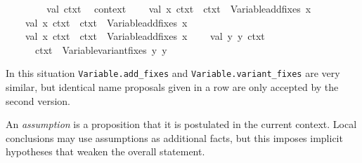 \begin{isabellebody}
\isanewline
%
\isadelimML
\ \ %
\endisadelimML
%
\isatagML
{}\isamarkupfalse%
\ {\isacharverbatimopen}\isanewline
\ \ \ \ val\ ctxt{}\ {\isacharequal}\ %
\isaantiq
context%
\endisaantiq
{\isacharsemicolon}\isanewline
\isanewline
\ \ \ \ val\ {\isacharparenleft}{\isacharbrackleft}x{}{\isacharbrackright}{\isacharcomma}\ ctxt{}{\isacharparenright}\ {\isacharequal}\ ctxt{}\ {\isacharbar}{\isachargreater}\ Variable{\isachardot}add{\isacharunderscore}fixes\ {\isacharbrackleft}{\isachardoublequote}x{\isachardoublequote}{\isacharbrackright}{\isacharsemicolon}\isanewline
\ \ \ \ val\ {\isacharparenleft}{\isacharbrackleft}x{}{\isacharbrackright}{\isacharcomma}\ ctxt{}{\isacharparenright}\ {\isacharequal}\ ctxt{}\ {\isacharbar}{\isachargreater}\ Variable{\isachardot}add{\isacharunderscore}fixes\ {\isacharbrackleft}{\isachardoublequote}x{\isachardoublequote}{\isacharbrackright}{\isacharsemicolon}\isanewline
\ \ \ \ val\ {\isacharparenleft}{\isacharbrackleft}x{}{\isacharbrackright}{\isacharcomma}\ ctxt{}{\isacharparenright}\ {\isacharequal}\ ctxt{}\ {\isacharbar}{\isachargreater}\ Variable{\isachardot}add{\isacharunderscore}fixes\ {\isacharbrackleft}{\isachardoublequote}x{\isachardoublequote}{\isacharbrackright}{\isacharsemicolon}\isanewline
\isanewline
\ \ \ \ val\ {\isacharparenleft}{\isacharbrackleft}y{}{\isacharcomma}\ y{}{\isacharbrackright}{\isacharcomma}\ ctxt{}{\isacharparenright}\ {\isacharequal}\isanewline
\ \ \ \ \ \ ctxt{}\ {\isacharbar}{\isachargreater}\ Variable{\isachardot}variant{\isacharunderscore}fixes\ {\isacharbrackleft}{\isachardoublequote}y{\isachardoublequote}{\isacharcomma}\ {\isachardoublequote}y{\isachardoublequote}{\isacharbrackright}{\isacharsemicolon}\isanewline
\ \ {\isacharverbatimclose}\isanewline
\ \ \isamarkupfalse%
%
\endisatagML
{\isafoldML}%
%
\isadelimML
%
\endisadelimML
%
\begin{isamarkuptext}%
In this situation \verb|Variable.add_fixes| and \verb|Variable.variant_fixes| are very similar, but identical name
  proposals given in a row are only accepted by the second version.%
\end{isamarkuptext}%
\isamarkuptrue%
%
\isamarkuptrue%
%
\begin{isamarkuptext}%
An \emph{assumption} is a proposition that it is postulated in the
  current context.  Local conclusions may use assumptions as
  additional facts, but this imposes implicit hypotheses that weaken
  the overall statement.


\end{isamarkuptext}
\end{isabellebody}
